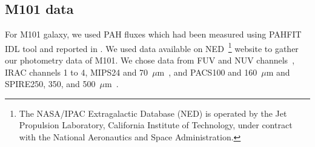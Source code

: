     \subsection{M101 data}
     For M101 galaxy, we used PAH fluxes which had been measured using {\tiny PAHFIT IDL} tool and reported in \cite{Gordon08}. 
     We used data available on NED~\footnote{The NASA/IPAC Extragalactic Database (NED) is operated by the Jet Propulsion Laboratory, California Institute of Technology, under contract with the National Aeronautics and Space Administration.} website to gather our photometry data of M101. 
     We chose data from \GALEX FUV and NUV channels~\citep{depaz07}, IRAC channels 1 to 4, MIPS24 and 70~$\mu$m~\cite{Dale09}, and  PACS100 and 160~$\mu$m and SPIRE250, 350, and 500~$\mu$m~\cite{Kennicutt11}. 